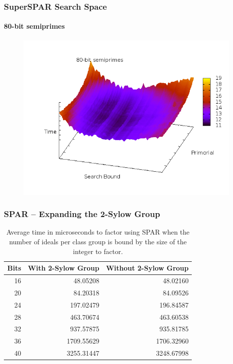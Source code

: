 \documentclass{beamer}
\begin{document}
\begin{frame}
\frametitle{SuperSPAR Search Space}
\framesubtitle{80-bit semiprimes}
\begin{figure}
\includegraphics[scale=0.47]{bits-80-3d.png}
\end{figure}
\end{frame}

\begin{frame}
\frametitle{SPAR -- Expanding the 2-Sylow Group}
\begin{table}
\centering
\begin{tabular}{| r | r | r |}
	\hline
	Bits & With 2-Sylow Group & Without 2-Sylow Group \\
	\hline
	16 &   48.05208 &   48.02160 \\
	20 &   84.20318 &   84.09526 \\
	24 &  197.02479 &  196.84587 \\
	28 &  463.70674 &  463.60538 \\
	32 &  937.57875 &  935.81785 \\
	36 & 1709.55629 & 1706.32960 \\
	40 & 3255.31447 & 3248.67998 \\
	\hline
\end{tabular}
\caption{Average time in microseconds to factor using SPAR when the number of ideals per class group is bound by the size of the integer to factor.}
\end{table}
\end{frame}
\end{document}
